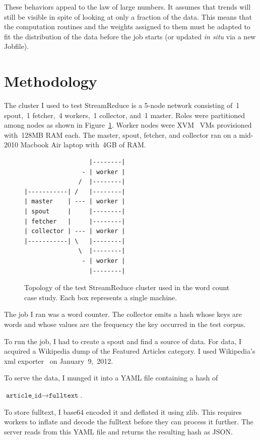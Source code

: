 \documentclass[12pt,twocolumn]{article}
\begin{document}
These behaviors appeal to the law of large numbers. It assumes that trends will still be
visible in spite of looking at only a fraction of the data. This means that the computation
routines and the weights assigned to them must be adapted to fit the distribution of the data
before the job starts (or updated \emph{in situ} via a new Jobfile).

\section{Methodology}
\label{sec:methodology}
The cluster I used to test StreamReduce is a 5-node network consisting of~1 spout,~1 fetcher,~4 workers,~1
collector, and~1 master. Roles were partitioned among nodes as shown in
Figure~\ref{fig:clusterDiagram}. Worker nodes were XVM~\cite{sipb:xvm} VMs provisioned with~128MB RAM each.
The master, spout, fetcher, and collector ran on a mid-2010 Macbook Air laptop with~4GB of RAM.

\begin{figure}
\begin{verbatim}
                  |--------|
                - | worker |
               /  |--------|
|-----------| /   |--------|
| master    | --- | worker |
| spout     |     |--------|
| fetcher   |     |--------|
| collector | --- | worker |
|-----------| \   |--------|
               \  |--------|
                - | worker |
                  |--------|
\end{verbatim}
\caption{Topology of the test StreamReduce cluster used in the word count case study. Each box represents a single machine.}
\label{fig:clusterDiagram}
\end{figure}

The job I ran was a word counter. The collector emits a hash whose keys are words and whose
values are the frequency the key occurred in the test corpus.

To run the job, I had to create a spout and find a source of data. For data, I acquired a
Wikipedia dump of the Featured Articles category. I used Wikipedia's xml
exporter~\cite{wikipedia:special:export} on January~9,~2012.

To serve the data, I munged it into a YAML file containing a hash of
\begin{center}
$\texttt{article\_id}\rightarrow\texttt{fulltext}$.
\end{center}
To store fulltext, I base64 encoded it and
deflated it using zlib. This requires workers to inflate and decode the fulltext before they
can process it further. The server reads from this YAML file and returns the resulting hash as
JSON.
\end{document}
